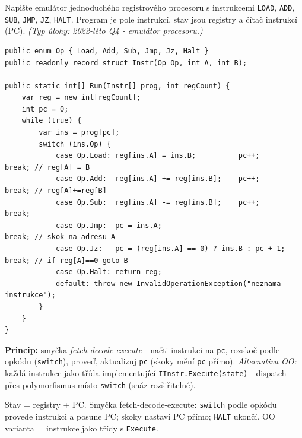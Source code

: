 \begin{zadani}
Napište emulátor jednoduchého registrového procesoru s instrukcemi \texttt{LOAD}, \texttt{ADD}, \texttt{SUB}, \texttt{JMP}, \texttt{JZ}, \texttt{HALT}. Program je pole instrukcí, stav jsou registry a čítač instrukcí (PC). \emph{(Typ úlohy: 2022-léto Q4 - emulátor procesoru.)}
\end{zadani}

\begin{reseni}
\begin{lstlisting}
public enum Op { Load, Add, Sub, Jmp, Jz, Halt }
public readonly record struct Instr(Op Op, int A, int B);

public static int[] Run(Instr[] prog, int regCount) {
    var reg = new int[regCount];
    int pc = 0;
    while (true) {
        var ins = prog[pc];
        switch (ins.Op) {
            case Op.Load: reg[ins.A] = ins.B;          pc++;            break; // reg[A] = B
            case Op.Add:  reg[ins.A] += reg[ins.B];    pc++;            break; // reg[A]+=reg[B]
            case Op.Sub:  reg[ins.A] -= reg[ins.B];    pc++;            break;
            case Op.Jmp:  pc = ins.A;                                   break; // skok na adresu A
            case Op.Jz:   pc = (reg[ins.A] == 0) ? ins.B : pc + 1;      break; // if reg[A]==0 goto B
            case Op.Halt: return reg;
            default: throw new InvalidOperationException("neznama instrukce");
        }
    }
}
\end{lstlisting}
\textbf{Princip:} smyčka \emph{fetch-decode-execute} - načti instrukci na \texttt{pc}, rozskoč podle opkódu (\texttt{switch}), proveď, aktualizuj \texttt{pc} (skoky mění \texttt{pc} přímo). \emph{Alternativa OO:} každá instrukce jako třída implementující \texttt{IInstr.Execute(state)} - dispatch přes polymorfismus místo \texttt{switch} (snáz rozšiřitelné).
\end{reseni}

\begin{jadro}
Stav = registry + PC. Smyčka fetch-decode-execute: \texttt{switch} podle opkódu provede instrukci a posune PC; skoky nastaví PC přímo; \texttt{HALT} ukončí. OO varianta = instrukce jako třídy s \texttt{Execute}.
\end{jadro}

